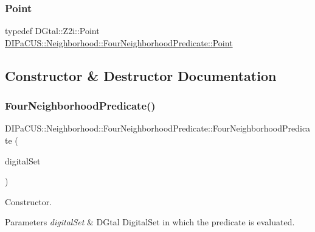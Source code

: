 \subsubsection{\texorpdfstring{Point}{Point}}
{\footnotesize\ttfamily typedef D\+Gtal\+::\+Z2i\+::\+Point \hyperlink{classDIPaCUS_1_1Neighborhood_1_1FourNeighborhoodPredicate_a5b162b7df8bf69ab1255dbee48de3298}{D\+I\+Pa\+C\+U\+S\+::\+Neighborhood\+::\+Four\+Neighborhood\+Predicate\+::\+Point}}



\subsection{Constructor \& Destructor Documentation}
\mbox{\label{classDIPaCUS_1_1Neighborhood_1_1FourNeighborhoodPredicate_a97e3418e93f5bb89fcc5fd331c8f6bc6}} 
\subsubsection{\texorpdfstring{Four\+Neighborhood\+Predicate()}{FourNeighborhoodPredicate()}}
{\footnotesize\ttfamily D\+I\+Pa\+C\+U\+S\+::\+Neighborhood\+::\+Four\+Neighborhood\+Predicate\+::\+Four\+Neighborhood\+Predicate (\begin{DoxyParamCaption}\item[{const \hyperlink{classDIPaCUS_1_1Neighborhood_1_1FourNeighborhoodPredicate_a9f81af73dae8303b1142e9ca6930c332}{Digital\+Set} \&}]{digital\+Set }\end{DoxyParamCaption})\hspace{0.3cm}{\ttfamily [explicit]}}



Constructor. 


\begin{DoxyParams}{Parameters}
{\em digital\+Set} & D\+Gtal Digital\+Set in which the predicate is evaluated. \\
\hline
\end{DoxyParams}


